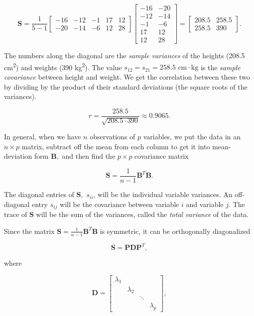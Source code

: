 \documentclass[
]{book}
\theoremstyle{definition}
\theoremstyle{definition}
\theoremstyle{definition}
\theoremstyle{definition}
\theoremstyle{remark}
\begin{document}
\[\mathbf{S}=\frac{1}{5-1}\begin{bmatrix} -16 & -12 & -1 & 17 & 12\\-20 & -14 & -6 & 12 & 28\end{bmatrix}\left[\begin{array}{rr} -16 & -20\\-12 & -14\\-1 & -6\\ 17 & 12\\12 & 28\end{array}\right]=\begin{bmatrix}208.5 & 258.5\\258.5 & 390\end{bmatrix}.\]

The numbers along the diagonal are the \emph{sample variances} of the heights (208.5 cm\textsuperscript{2}) and weights (390 kg\textsuperscript{2}). The value \(s_{12}=s_{21}=258.5 \text{ cm}\cdot\text{kg}\) is the \emph{sample covariance} between height and weight. We get the correlation between these two by dividing by the product of their standard deviations (the square roots of the variances).

\[r=\frac{258.5}{\sqrt{208.5\cdot 390}}\approx 0.9065.\]

In general, when we have \(n\) observations of \(p\) variables, we put the data in an \(n\times p\) matrix, subtract off the mean from each column to get it into mean-deviation form \(\mathbf{B},\) and then find the \(p\times p\) covariance matrix

\[\mathbf{S}=\frac{1}{n-1}\mathbf{B}^T\mathbf{B}.\]

The diagonal entries of \(\mathbf{S},\) \(s_{ii}\), will be the individual variable variances. An off-diagonal entry \(s_{ij}\) will be the covariance between variable \(i\) and variable \(j\). The trace of \(\mathbf{S}\) will be the sum of the variances, called the \emph{total variance} of the data.

Since the matrix \(\mathbf{S}=\frac{1}{n-1}\mathbf{B}^T\mathbf{B}\) is symmetric, it can be orthogonally diagonalized

\[\mathbf{S}=\mathbf{P}\mathbf{D}\mathbf{P}^T,\]

where

\[\mathbf{D}=\begin{bmatrix} \lambda_1 & &&\\  & \lambda_2 &&\\
&&\ddots &\\
&&& \lambda_p\end{bmatrix},\]
\end{document}
